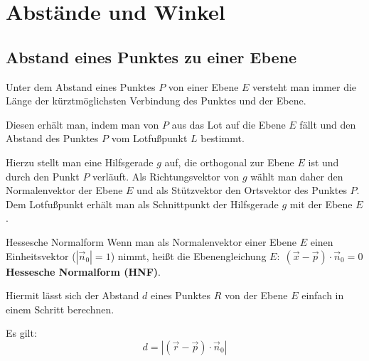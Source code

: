 \documentclass{article}
\begin{document}
\section{Abstände und Winkel}
\subsection{Abstand eines Punktes zu einer Ebene}
\label{abstandpunkteebene}
Unter dem Abstand eines Punktes $P$ von einer Ebene $E$ versteht man 
immer die Länge der kürztmöglichsten Verbindung des Punktes und der Ebene.

Diesen erhält man, indem man von $P$ aus das Lot auf die Ebene $E$ fällt 
und den Abstand des Punktes $P$ vom Lotfußpunkt $L$ bestimmt.
\begin{figure}[H]
    \centering
\end{figure}
Hierzu stellt man eine Hilfsgerade $g$ auf, die orthogonal zur Ebene $E$ ist
und durch den Punkt $P$ verläuft.
Als Richtungsvektor von $g$ wählt man daher den Normalenvektor der Ebene $E$
und als Stützvektor den Ortsvektor des Punktes $P$.
Dem Lotfußpunkt erhält man als Schnittpunkt der Hilfsgerade $g$ mit der Ebene $E$.
\begin{boxx}[Red]{Hessesche Normalform}
    Wenn man als Normalenvektor einer Ebene $E$ einen Einheitsvektor ($\left|\vec{n}_0\right|=1$) nimmt,
    heißt die Ebenengleichung $\displaystyle E:\; \left(\vec{x}- \vec{p}\right)\cdot \vec{n}_0 = 0$ 
    \textbf{Hessesche Normalform (HNF)}.

    Hiermit lässt sich der Abstand $d$ eines Punktes $R$ von der Ebene $E$ einfach in einem Schritt berechnen.

    Es gilt:
    \[d = \left|\left(\vec{r}-\vec{p}\right)\cdot \vec{n}_0\right|\]
\end{boxx}
\end{document}

